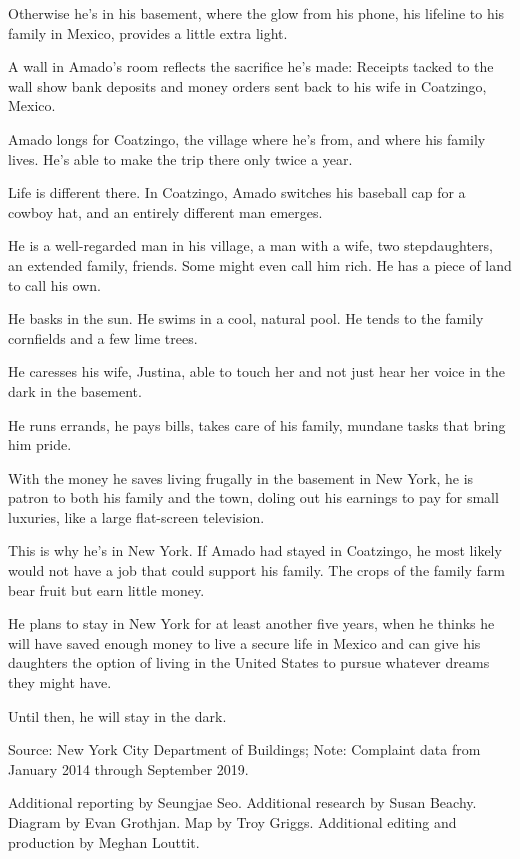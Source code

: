 Otherwise he's in his basement, where the glow from his phone, his
lifeline to his family in Mexico, provides a little extra light.

A wall in Amado's room reflects the sacrifice he's made: Receipts tacked
to the wall show bank deposits and money orders sent back to his wife in
Coatzingo, Mexico.

Amado longs for Coatzingo, the village where he's from, and where his
family lives. He's able to make the trip there only twice a year.

Life is different there. In Coatzingo, Amado switches his baseball cap
for a cowboy hat, and an entirely different man emerges.

He is a well-regarded man in his village, a man with a wife, two
stepdaughters, an extended family, friends. Some might even call him
rich. He has a piece of land to call his own.

He basks in the sun. He swims in a cool, natural pool. He tends to the
family cornfields and a few lime trees.

He caresses his wife, Justina, able to touch her and not just hear her
voice in the dark in the basement.

He runs errands, he pays bills, takes care of his family, mundane tasks
that bring him pride.

With the money he saves living frugally in the basement in New York, he
is patron to both his family and the town, doling out his earnings to
pay for small luxuries, like a large flat-screen television.

This is why he's in New York. If Amado had stayed in Coatzingo, he most
likely would not have a job that could support his family. The crops of
the family farm bear fruit but earn little money.

He plans to stay in New York for at least another five years, when he
thinks he will have saved enough money to live a secure life in Mexico
and can give his daughters the option of living in the United States to
pursue whatever dreams they might have.

Until then, he will stay in the dark.

Source: New York City Department of Buildings; Note: Complaint data from
January 2014 through September 2019.

Additional reporting by Seungjae Seo. Additional research by Susan
Beachy. Diagram by Evan Grothjan. Map by Troy Griggs. Additional editing
and production by Meghan Louttit.

\subsection{}

